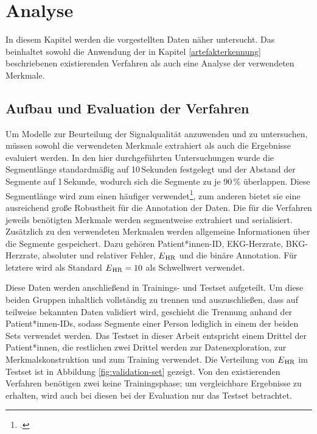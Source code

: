 \chapter{Analyse}\label{analyse}

In diesem Kapitel werden die vorgestellten Daten näher untersucht. Das beinhaltet sowohl die Anwendung der in Kapitel \ref{artefakterkennung} beschriebenen existierenden Verfahren als auch eine Analyse der verwendeten Merkmale.

\section{Aufbau und Evaluation der Verfahren}

Um Modelle zur Beurteilung der Signalqualität anzuwenden und zu untersuchen, müssen sowohl die verwendeten Merkmale extrahiert als auch die Ergebnisse evaluiert werden. In den hier durchgeführten Untersuchungen wurde die Segmentlänge standardmäßig auf 10\,Sekunden festgelegt und der Abstand der Segmente auf 1\,Sekunde, wodurch sich die Segmente zu je 90\,\% überlappen. Diese Segmentlänge wird zum einen häufiger verwendet\footcite[Vgl.][]{Yu2020, Sadek2016, Orphanidou2015}, zum anderen bietet sie eine ausreichend große Robustheit für die Annotation der Daten. Die für die Verfahren jeweils benötigten Merkmale werden segmentweise extrahiert und serialisiert. Zusätzlich zu den verwendeten Merkmalen werden allgemeine Informationen über die Segmente gespeichert. Dazu gehören Patient*innen-ID, EKG-Herzrate, BKG-Herzrate, absoluter und relativer Fehler, $E\textsubscript{HR}$ und die binäre Annotation. Für letztere wird als Standard $E\textsubscript{HR} = 10$ als Schwellwert verwendet.

Diese Daten werden anschließend in Trainings- und Testset aufgeteilt. Um diese beiden Gruppen inhaltlich vollständig zu trennen und auszuschließen, dass auf teilweise bekannten Daten validiert wird, geschieht die Trennung anhand der Patient*innen-IDs, sodass Segmente einer Person lediglich in einem der beiden Sets verwendet werden. Das Testset in dieser Arbeit entspricht einem Drittel der Patient*innen, die restlichen zwei Drittel werden zur Datenexploration, zur Merkmalskonstruktion und zum Training verwendet. Die Verteilung von $E\textsubscript{HR}$ im Testset ist in Abbildung \ref{fig:validation-set} gezeigt. Von den existierenden Verfahren benötigen zwei keine Trainingsphase; um vergleichbare Ergebnisse zu erhalten, wird auch bei diesen bei der Evaluation nur das Testset betrachtet.

